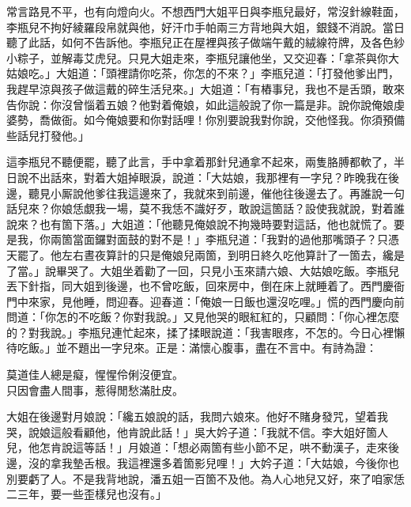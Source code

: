 常言路見不平，也有向燈向火。不想西門大姐平日與李瓶兒最好，常沒針線鞋面，李瓶兒不拘好綾羅段帛就與他，好汗巾手帕兩三方背地與大姐，銀錢不消說。當日聽了此話，如何不告訴他。李瓶兒正在屋裡與孩子做端午戴的絨線符牌，及各色紗小粽子，並解毒艾虎兒。{}只見大姐走來，李瓶兒讓他坐，又交迎春：「拿茶與你大姑娘吃。」大姐道：「頭裡請你吃茶，你怎的不來？」李瓶兒道：「打發他爹出門，我趕早涼與孩子做這戴的碎生活兒來。」大姐道：「有樁事兒，我也不是舌頭，敢來告你說：你沒曾惱着五娘？他對着俺娘，如此這般說了你一篇是非。說你說俺娘虔婆勢，喬做衙。如今俺娘要和你對話哩！你別要說我對你說，交他怪我。你須預備些話兒打發他。」

這李瓶兒不聽便罷，聽了此言，手中拿着那針兒通拿不起來，兩隻胳膊都軟了，半日說不出話來，對着大姐掉眼淚，說道：「大姑娘，我那裡有一字兒？昨晚我在後邊，聽見小厮說他爹往我這邊來了，我就來到前邊，催他往後邊去了。再誰說一句話兒來？你娘恁覷我一場，莫不我恁不識好歹，敢說這箇話？設使我就說，對着誰說來？也有箇下落。」大姐道：「他聽見俺娘說不拘幾時要對這話，他也就慌了。要是我，你兩箇當面鑼對面鼓的對不是！」李瓶兒道：「我對的過他那嘴頭子？只憑天罷了。他左右晝夜算計的只是俺娘兒兩箇，到明日終久吃他算計了一箇去，纔是了當。」{}說畢哭了。大姐坐着勸了一回，只見小玉來請六娘、大姑娘吃飯。李瓶兒丟下針指，同大姐到後邊，也不曾吃飯，回來房中，倒在床上就睡着了。西門慶衙門中來家，見他睡，問迎春。迎春道：「俺娘一日飯也還沒吃哩。」慌的西門慶向前問道：「你怎的不吃飯？你對我說。」又見他哭的眼紅紅的，只顧問：「你心裡怎麼的？對我說。」李瓶兒連忙起來，揉了揉眼說道：「我害眼疼，不怎的。今日心裡懶待吃飯。」並不題出一字兒來。正是：滿懷心腹事，盡在不言中。有詩為證：

\begin{myquote} 
莫道佳人總是癡，惺惺伶俐沒便宜。\\只因會盡人間事，惹得閒愁滿肚皮。
\end{myquote} 

大姐在後邊對月娘說：「纔五娘說的話，我問六娘來。他好不賭身發咒，望着我哭，說娘這般看顧他，他肯說此話！」吳大妗子道：「我就不信。李大姐好箇人兒，他怎肯說這等話！」月娘道：「想必兩箇有些小節不足，哄不動漢子，走來後邊，沒的拿我墊舌根。我這裡還多着箇影兒哩！」{}大妗子道：「大姑娘，今後你也別要虧了人。不是我背地說，潘五姐一百箇不及他。為人心地兒又好，來了咱家恁二三年，要一些歪樣兒也沒有。」

